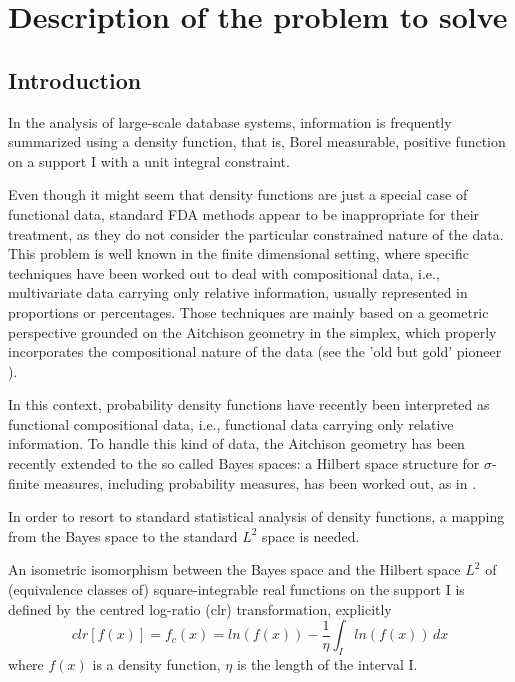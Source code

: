 \chapter{Description of the problem to solve}
\newtheorem*{definition}{Definition}
\label{problem}

\noindent 
\section{Introduction}
In the analysis of large-scale database systems, information is frequently summarized using a density function, that is, Borel measurable, positive function on a support $\text{I}$ with a unit integral constraint. 

Even though it might seem that density functions are just a special case of functional data, standard FDA methods appear to be inappropriate for their treatment, as they do not consider the particular constrained nature of the data. 
This problem is well known in the finite dimensional setting, where specific techniques have been worked out to deal with compositional data, i.e., multivariate data carrying only relative information, usually represented in proportions or percentages. 
Those techniques are mainly based on a geometric perspective grounded on the Aitchison geometry in the simplex, which properly incorporates the compositional nature of the data (see the 'old but gold' pioneer \citep{aitchinson:bayes}). 

In this context, probability density functions have recently been interpreted as functional compositional data, i.e., functional data carrying only relative information.
To handle this kind of data, the Aitchison geometry has been recently extended to the so called Bayes spaces: a Hilbert space structure for $\sigma$-finite measures, including probability measures, has been worked out, as in \citep{vdboogaart:bayes}.

In order to resort to standard statistical analysis of density functions, a mapping from the Bayes space to the standard $\textit{L}^2$ space is needed. 

An isometric isomorphism between the Bayes space and the Hilbert space $\textit{L}^2$ of (equivalence classes of) square-integrable real functions on the support $\text{I}$ is defined by the centred log-ratio (clr) transformation, explicitly 
\[	clr[f(x)] = f_c(x) = ln(f(x)) - \frac{1}{\eta}\int_{I} ln(f(x))\, dx 	\]
where $f(x)$ is a density function, $\eta$ is the length of the interval I.

